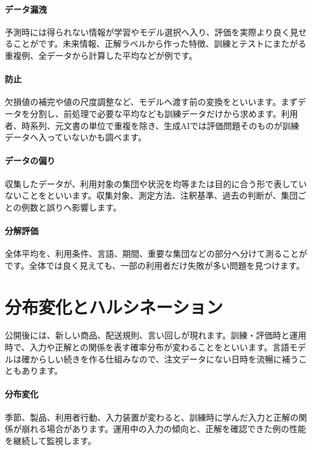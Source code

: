 \begingroup
\begingroup
\paragraph{データ漏洩}
        予測時には得られない情報が学習やモデル選択へ入り、評価を実際より良く見せることがです。未来情報、正解ラベルから作った特徴、訓練とテストにまたがる重複例、全データから計算した平均などが例です。

\paragraph{防止}
        欠損値の補完や値の尺度調整など、モデルへ渡す前の変換をといいます。まずデータを分割し、前処理で必要な平均なども訓練データだけから求めます。利用者、時系列、元文書の単位で重複を除き、生成AIでは評価問題そのものが訓練データへ入っていないかも調べます。

\par
\endgroup
\medskip
\begingroup
\paragraph{データの偏り}
        収集したデータが、利用対象の集団や状況を均等または目的に合う形で表していないことをといいます。収集対象、測定方法、注釈基準、過去の判断が、集団ごとの例数と誤りへ影響します。

\paragraph{分解評価}
        全体平均を、利用条件、言語、期間、重要な集団などの部分へ分けて測ることがです。全体では良く見えても、一部の利用者だけ失敗が多い問題を見つけます。

\par
\endgroup
\par
\endgroup


\section{分布変化とハルシネーション}
\label{sec:06-machine-learning-33}

公開後には、新しい商品、配送規則、言い回しが現れます。訓練・評価時と運用時で、入力や正解との関係を表す確率分布が変わることをといいます。言語モデルは確からしい続きを作る仕組みなので、注文データにない日時を流暢に補うこともあります。

\begingroup
\begingroup
\paragraph{分布変化}
        季節、製品、利用者行動、入力装置が変わると、訓練時に学んだ入力と正解の関係が崩れる場合があります。運用中の入力の傾向と、正解を確認できた例の性能を継続して監視します。


